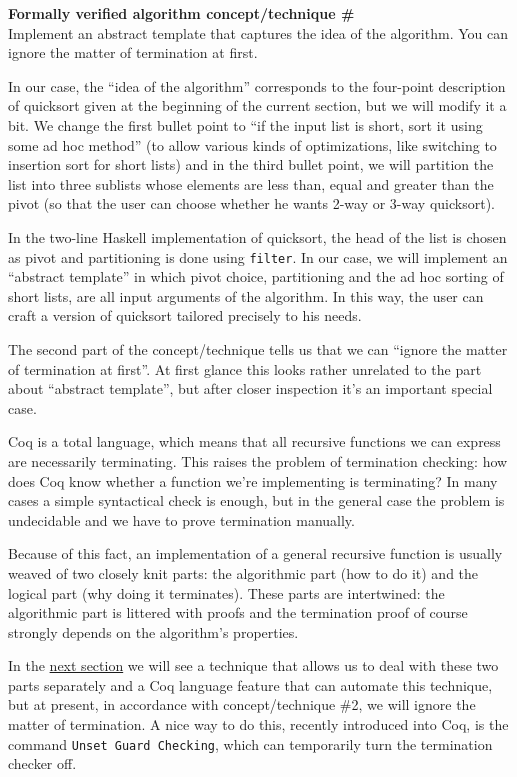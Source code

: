 \documentclass[declaration,mgr,english,shortabstract]{iithesis}
\newcommand{\m}[1]{\texttt{#1}}
\newcounter{cnt}
\newcommand{\runcnt}{\#\arabic{cnt}}
\newcommand{\concept}[1]
{
    \refstepcounter{cnt}
    \begin{center}
        \textbf{Formally verified algorithm concept/technique \runcnt} \\
        #1
    \end{center}
}
\begin{document}
\concept{Implement an abstract template that captures the idea of the algorithm. You can ignore the matter of termination at first.}

In our case, the ``idea of the algorithm'' corresponds to the four-point description of quicksort given at the beginning of the current section, but we will modify it a bit. We change the first bullet point to ``if the input list is short, sort it using some ad hoc method'' (to allow various kinds of optimizations, like switching to insertion sort for short lists) and in the third bullet point, we will partition the list into three sublists whose elements are less than, equal and greater than the pivot (so that the user can choose whether he wants 2-way or 3-way quicksort).

In the two-line Haskell implementation of quicksort, the head of the list is chosen as pivot and partitioning is done using \m{filter}. In our case, we will implement an ``abstract template'' in which pivot choice, partitioning and the ad hoc sorting of short lists, are all input arguments of the algorithm. In this way, the user can craft a version of quicksort tailored precisely to his needs.

The second part of the concept/technique tells us that we can ``ignore the matter of termination at first''. At first glance this looks rather unrelated to the part about ``abstract template'', but after closer inspection it's an important special case.

Coq is a total language, which means that all recursive functions we can express are necessarily terminating. This raises the problem of termination checking: how does Coq know whether a function we're implementing is terminating? In many cases a simple syntactical check is enough, but in the general case the problem is undecidable and we have to prove termination manually.

Because of this fact, an implementation of a general recursive function is usually weaved of two closely knit parts: the algorithmic part (how to do it) and the logical part (why doing it terminates). These parts are intertwined: the algorithmic part is littered with proofs and the termination proof of course strongly depends on the algorithm's properties.

In the \hyperref[sanity1]{next section} we will see a technique that allows us to deal with these two parts separately and a Coq language feature that can automate this technique, but at present, in accordance with concept/technique \#2, we will ignore the matter of termination. A nice way to do this, recently introduced into Coq, is the command \m{Unset Guard Checking}, which can temporarily turn the termination checker off.
\end{document}
